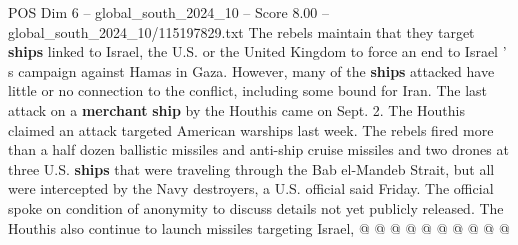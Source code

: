 \begin{textsample}{POS Dim 6 – global\_south\_2024\_10 – Score 8.00 – global\_south\_2024\_10/115197829.txt}
The rebels maintain that they target \textbf{ships} linked to Israel, the U.S. or the United Kingdom to force an end to Israel ' s campaign against Hamas in Gaza.
However, many of the \textbf{ships} attacked have little or no connection to the conflict, including some bound for Iran.
The last attack on a \textbf{merchant} \textbf{ship} by the Houthis came on Sept. 2.
The Houthis claimed an attack targeted American warships last week.
The rebels fired more than a half dozen ballistic missiles and anti-ship cruise missiles and two drones at three U.S. \textbf{ships} that were traveling through the Bab el-Mandeb Strait, but all were intercepted by the Navy destroyers, a U.S. official said Friday.
The official spoke on condition of anonymity to discuss details not yet publicly released.
The Houthis also continue to launch missiles targeting Israel, @ @ @ @ @ @ @ @ @ @

\end{textsample}
